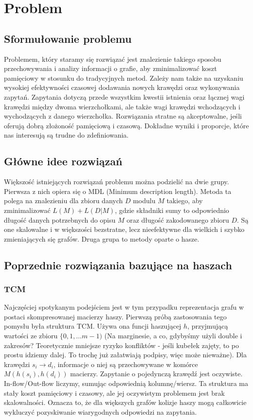 \documentclass{article}
\theoremstyle{definition}
\begin{document}
    \section{Problem}
    
    \subsection{Sformułowanie problemu}
        Problemem, który staramy się rozwiązać jest znalezienie takiego sposobu przechowywania i analizy informacji o grafie, aby zminimalizować koszt pamięciowy w stosunku do tradycyjnych metod. Zależy nam także na uzyskaniu wysokiej efektywności czasowej dodawania nowych krawędzi oraz wykonywania zapytań. Zapytania dotyczą przede wszystkim kwestii istnienia oraz łącznej wagi krawędzi między dwoma wierzchołkami, ale także wagi krawędzi wchodzących i wychodzących z danego wierzchołka. Rozwiązania stratne są akceptowalne, jeśli oferują dobrą złożoność pamięciową i czasową. Dokładne wyniki i proporcje, które nas interesują są trudne do zdefiniowania. 
    
    \subsection{Główne idee rozwiązań}
        Większość istniejących rozwiązań problemu można podzielić na dwie grupy. Pierwsza z nich opiera się o MDL (Minimum description length). Metoda ta polega na znalezieniu dla zbioru danych $D$ modulu $M$ takiego, aby zminimalizować $L(M) + L(D|M)$, gdzie składniki sumy to odpowiednio długość danych potrzebnych do opisu $M$ oraz długość zakodowanego zbioru $D$. Są one skalowalne i w większości bezstratne, lecz nieefektywne dla wielkich i szybko zmieniających się grafów. Druga grupa to metody oparte o hasze. 

    \subsection{Poprzednie rozwiązania bazujące na haszach}
        \subsubsection{TCM}
            Najczęściej spotykanym podejściem jest w tym przypadku reprezentacja grafu w postaci skompresowanej macierzy haszy. Pierwszą próbą zastosowania tego pomysłu była struktura TCM. Używa ona funcji haszującej $h$, przyjmującą wartości ze zbioru $\{0, 1,\dots m - 1)$ (Na marginesie, a co, gdybyśmy użyli double i zakresów? Teoretycznie mniejsze ryzyko konfliktów - jeśli kubełek zajęty, to po prostu idziemy dalej. To trochę już załatwiają podpisy, więc może nieważne). Dla krawędzi $s_i \rightarrow d_i$, informacje o niej są przechowywane w komórce $M(h(s_i), h(d_i))$ macierzy. Zapytanie o pojedynczą krawędź jest oczywiste. In-flow/Out-flow liczymy, sumując odpowiednią kolumnę/wiersz. Ta struktura ma stały koszt pamięciowy i czasowy, ale jej oczywistym problemem jest brak skalowalności. Oznacza to, że dla większych grafów kolizje haszy mogą całkowicie wykluczyć pozyskiwanie wiarygodnych odpowiedzi na zapytania.
        
\end{document}
